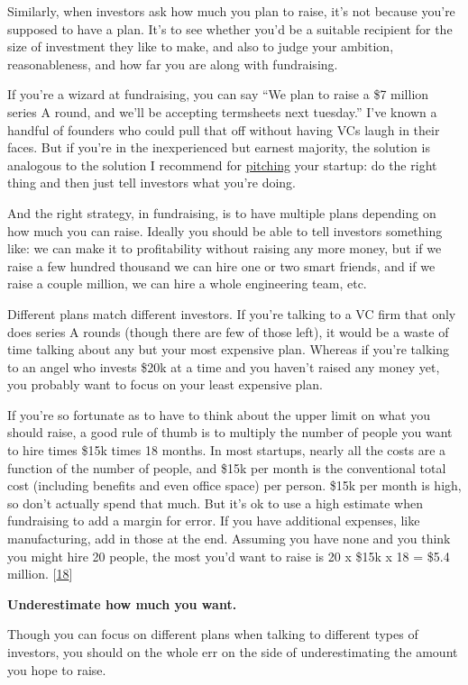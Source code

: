 Similarly, when investors ask how much you plan to raise, it's not
because you're supposed to have a plan. It's to see whether you'd be a
suitable recipient for the size of investment they like to make, and
also to judge your ambition, reasonableness, and how far you are along
with fundraising.

If you're a wizard at fundraising, you can say ``We plan to raise a \$7
million series A round, and we'll be accepting termsheets next
tuesday.'' I've known a handful of founders who could pull that off
without having VCs laugh in their faces. But if you're in the
inexperienced but earnest majority, the solution is analogous to the
solution I recommend for \href{convince.html}{pitching} your startup: do
the right thing and then just tell investors what you're doing.

And the right strategy, in fundraising, is to have multiple plans
depending on how much you can raise. Ideally you should be able to tell
investors something like: we can make it to profitability without
raising any more money, but if we raise a few hundred thousand we can
hire one or two smart friends, and if we raise a couple million, we can
hire a whole engineering team, etc.

Different plans match different investors. If you're talking to a VC
firm that only does series A rounds (though there are few of those
left), it would be a waste of time talking about any but your most
expensive plan. Whereas if you're talking to an angel who invests \$20k
at a time and you haven't raised any money yet, you probably want to
focus on your least expensive plan.

If you're so fortunate as to have to think about the upper limit on what
you should raise, a good rule of thumb is to multiply the number of
people you want to hire times \$15k times 18 months. In most startups,
nearly all the costs are a function of the number of people, and \$15k
per month is the conventional total cost (including benefits and even
office space) per person. \$15k per month is high, so don't actually
spend that much. But it's ok to use a high estimate when fundraising to
add a margin for error. If you have additional expenses, like
manufacturing, add in those at the end. Assuming you have none and you
think you might hire 20 people, the most you'd want to raise is 20 x
\$15k x 18 = \$5.4 million. {[}\hyperref[f18n]{18}{]}

\textbf{Underestimate how much you want.}

Though you can focus on different plans when talking to different types
of investors, you should on the whole err on the side of underestimating
the amount you hope to raise.

